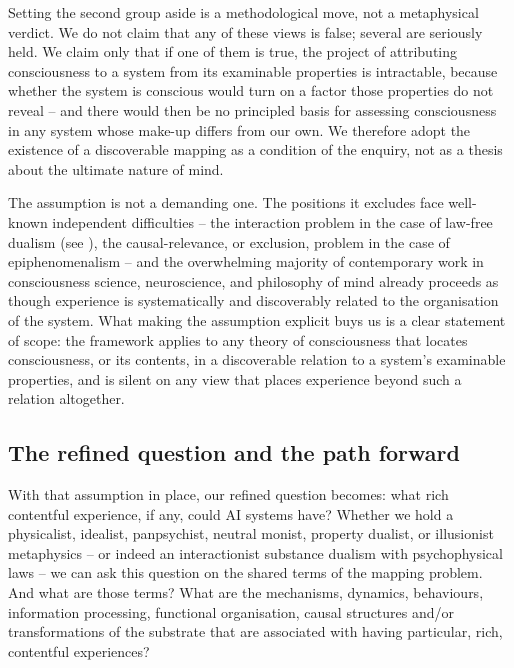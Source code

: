 \documentclass[11pt, a4paper, onecolumn, gdm]{google}
\begin{document}
Setting the second group aside is a methodological move, not a metaphysical verdict.
We do not claim that any of these views is false; several are seriously held.
We claim only that if one of them is true, the project of attributing consciousness to a system from its examinable properties is intractable, because whether the system is conscious would turn on a factor those properties do not reveal -- and there would then be no principled basis for assessing consciousness in any system whose make-up differs from our own.
We therefore adopt the existence of a discoverable mapping as a condition of the enquiry, not as a thesis about the ultimate nature of mind.

The assumption is not a demanding one.
The positions it excludes face well-known independent difficulties -- the interaction problem in the case of law-free dualism (see ), the causal-relevance, or exclusion, problem in the case of epiphenomenalism -- and the overwhelming majority of contemporary work in consciousness science, neuroscience, and philosophy of mind already proceeds as though experience is systematically and discoverably related to the organisation of the system.
What making the assumption explicit buys us is a clear statement of scope: the framework applies to any theory of consciousness that locates consciousness, or its contents, in a discoverable relation to a system's examinable properties, and is silent on any view that places experience beyond such a relation altogether.

\subsection{The refined question and the path forward}\label{the-refined-question-and-the-path-forward}

With that assumption in place, our refined question becomes: what rich contentful experience, if any, could AI systems have?
Whether we hold a physicalist, idealist, panpsychist, neutral monist, property dualist, or illusionist metaphysics -- or indeed an interactionist substance dualism with psychophysical laws -- we can ask this question on the shared terms of the mapping problem.
And what are those terms?
What are the mechanisms, dynamics, behaviours, information processing, functional organisation, causal structures and/or transformations of the substrate that are associated with having particular, rich, contentful experiences?
\end{document}
